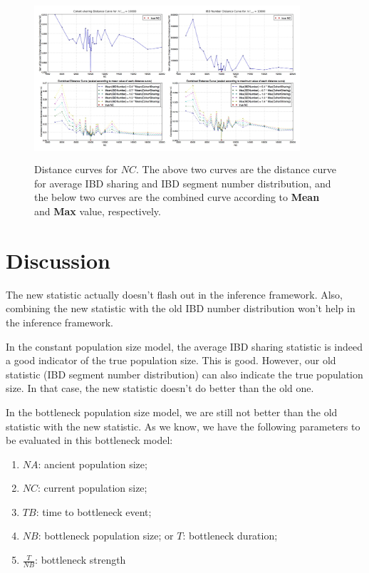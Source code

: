 \documentclass{bioinfo}
\begin{document}
\begin{figure}[h]
\centerline{\includegraphics[width=280pt, height=170pt]{like_com_NC.jpg}}
\caption{Distance curves for $NC$. The above two curves are the distance curve for average IBD sharing and IBD segment number distribution, and the below two curves are the combined curve according to \textbf{Mean} and \textbf{Max} value, respectively.}\label{fig:dis_com_NC}
\end{figure}




\section{Discussion}

The new statistic actually doesn't flash out in the inference framework. Also, combining the new statistic with the old IBD number distribution won't help in the inference framework.

In the constant population size model, the average IBD sharing statistic is indeed a good indicator of the true population size. This is good. However, our old statistic (IBD segment number distribution) can also indicate the true population size. In that case, the new statistic doesn't do better than the old one.

In the bottleneck population size model, we are still not better than the old statistic with the new statistic. As we know, we have the following parameters to be evaluated in this bottleneck model:

\begin{enumerate}
\item $NA$: ancient population size;
\item $NC$: current population size;
\item $TB$: time to bottleneck event;
\item $NB$: bottleneck population size; or $T$: bottleneck duration;
\item $\frac{T}{NB}$: bottleneck strength
\end{enumerate}
\end{document}

